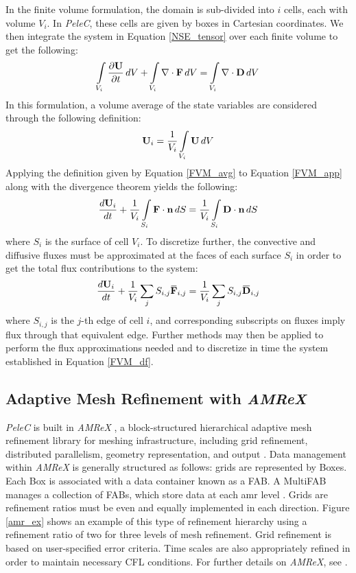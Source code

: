 In the finite volume formulation, the domain is sub-divided into $i$ cells, each with volume $V_i$. In \textit{PeleC}, these cells are given by boxes in Cartesian coordinates. We then integrate the system in Equation \ref{NSE_tensor} over each finite volume to get the following:
\begin{equation} \label{FVM_app}
\int\limits_{V_i} \dfrac{\partial \vb{U}}{\partial t}\, dV + \int\limits_{V_i} \nabla \cdot \vb{F}\, dV = \int\limits_{V_i} \nabla \cdot \vb{D}\, dV
\end{equation}
In this formulation, a volume average of the state variables are considered through the following definition:
\begin{equation} \label{FVM_avg}
\vb{U}_i = \dfrac{1}{V_i} \int\limits_{V_i} \vb{U} \, dV
\end{equation} 
Applying the definition given by Equation \ref{FVM_avg} to Equation \ref{FVM_app} along with the divergence theorem yields the following:
\begin{equation} \label{FVM}
\dfrac{d\vb{U}_i}{dt} + \dfrac{1}{V_i} \int\limits_{S_i} \vb{F}\cdot \vb{n}\, dS = \dfrac{1}{V_i} \int\limits_{S_i} \vb{D} \cdot \vb{n} \, dS 
\end{equation}
where $S_i$ is the surface of cell $V_i$. To discretize further, the convective and diffusive fluxes must be approximated at the faces of each surface $S_i$ in order to get the total flux contributions to the system:
\begin{equation} \label{FVM_df}
\dfrac{d\vb{U}_i}{dt} +  \dfrac{1}{V_i} \sum\limits_j S_{i,j} \overbar{\vb{F}}_{i,j} =  \dfrac{1}{V_i}\sum\limits_j S_{i,j} \overbar{\vb{D}}_{i,j}
\end{equation}
where $S_{i,j}$ is the $j$-th edge of cell $i$, and corresponding subscripts on fluxes imply flux through that equivalent edge. Further methods may then be applied to perform the flux approximations needed and to discretize in time the system established in Equation \ref{FVM_df}. 

\subsection{Adaptive Mesh Refinement with \textit{AMReX}}
\textit{PeleC} is built in \textit{AMReX} \cite{amrex1, amrex2, amrex3}, a block-structured hierarchical adaptive mesh refinement library for meshing infrastructure, including grid refinement, distributed parallelism, geometry representation, and output \cite{PeleC1}. Data management within \textit{AMReX} is generally structured as follows: grids are represented by Boxes. Each Box is associated with a data container known as a FAB. A MultiFAB manages a collection of FABs, which store data at each \gls{amr} level \cite{PeleC1}. Grids are refinement ratios must be even and equally implemented in each direction. Figure \ref{amr_ex} shows an example of this type of refinement hierarchy using a refinement ratio of two for three levels of mesh refinement. Grid refinement is based on user-specified error criteria. Time scales are also appropriately refined in order to maintain necessary CFL conditions. For further details on \textit{AMReX}, see \cite{amrex1}. 

